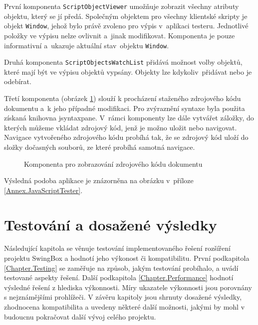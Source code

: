 \vspace{-1em}

První komponenta \texttt{ScriptObjectViewer} umožňuje zobrazit všechny atributy objektu, který se jí předá. Společným objektem pro všechny klientské skripty je objekt \texttt{Window}, jehož bylo právě zvoleno pro výpis v~aplikaci testeru. Jednotlivé položky ve výpisu nelze ovlivnit a~jinak modifikovat. Komponenta je pouze informativní a~ukazuje aktuální stav~objektu \texttt{Window}.

Druhá komponenta \texttt{ScriptObjectsWatchList} přidává možnost volby objektů, které mají být ve výpisu objektů vypsány. Objekty lze kdykoliv~přidávat nebo je odebírat.  

Třetí komponenta (obrázek \ref{Figure.SourceCodeComponent}) slouží k procházení staženého zdrojového kódu dokumentu a~k jeho případné modifikaci. Pro zvýraznění syntaxe byla použita získaná knihovna jsyntaxpane. V~rámci komponenty lze dále vytvářet záložky, do kterých můžeme vkládat zdrojový kód, jenž je možno uložit nebo navigovat. Navigace vytvořeného zdrojového kódu probíhá tak, že se zdrojový kód uloží do složky dočasných souborů, ze které probíhá samotná navigace. 

\begin{figure}[H]
  \begin{center}
    \caption{Komponenta pro zobrazování zdrojového kódu dokumentu}
    \label{Figure.SourceCodeComponent}
  \end{center}
\end{figure}

\vspace{-1em}

\noindent Výsledná podoba aplikace je znázorněna na obrázku v~příloze \ref{Annex.JavaScriptTester}.

\chapter{Testování a dosažené výsledky}
\label{Chapter.TestingAndResults}

Následující kapitola se věnuje testování implementovaného řešení rozšíření projektu SwingBox a hodnotí jeho výkonost či kompatibilitu. První podkapitola \ref{Chapter.Testing} se zaměřuje na způsob,  jakým testování probíhalo, a uvádí testované aspekty řešení.  Další podkapitola \ref{Chapter.Performance} hodnotí výsledné řešení z hlediska výkonnosti. Míry ukazatele výkonnosti jsou porovnány s nejznámějšími prohlížeči. V závěru kapitoly jsou shrnuty dosažené výsledky, zhodnocena kompatibilita a uvedeny některé další možnosti, jakými by mohl v budoucnu pokračovat další vývoj celého projektu.

